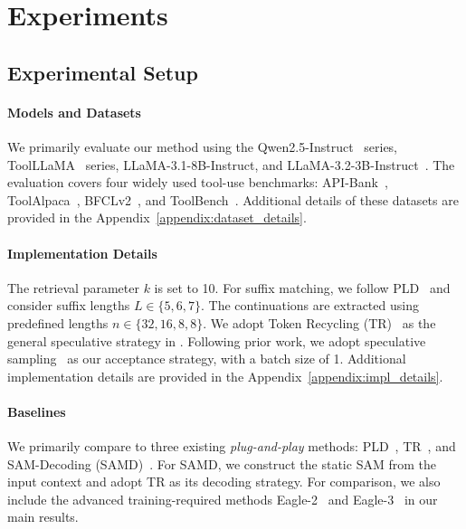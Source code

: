 \section{Experiments}

\subsection{Experimental Setup}
\label{sec:exp_setup}

\paragraph{Models and Datasets} 
We primarily evaluate our method using the Qwen2.5-Instruct~\citep{Qwen2.5} series, ToolLLaMA~\citep{Qin:2024toolllm} series, LLaMA-3.1-8B-Instruct, and LLaMA-3.2-3B-Instruct~\citep{llama3}. The evaluation covers four widely used tool-use benchmarks: API-Bank~\citep{apibank}, ToolAlpaca~\cite{ToolAlpaca}, BFCLv2~\cite{BFCL}, and ToolBench~\cite{Qin:2024toolllm}. Additional details of these datasets are provided in the Appendix~\ref{appendix:dataset_details}.

\paragraph{Implementation Details} 
The retrieval parameter $k$ is set to 10. For suffix matching, we follow PLD~\citep{saxena2023pld} and consider suffix lengths $L \in \{5,6,7\}$. The continuations are extracted using predefined lengths $n \in \{32, 16, 8, 8\}$. We adopt Token Recycling (TR)~\citep{luo:2025tokenrecycle} as the general speculative strategy in \method. Following prior work, we adopt speculative sampling~\citep{leviathan:2023spec} as our acceptance strategy, with a batch size of 1. Additional implementation details are provided in the Appendix~\ref{appendix:impl_details}.

\paragraph{Baselines} 
We primarily compare \method to three existing \textit{plug-and-play} methods: PLD~\citep{saxena2023pld}, TR~\citep{luo:2025tokenrecycle}, and SAM-Decoding (SAMD)~\citep{hu2025:samd}. For SAMD, we construct the static SAM from the input context and adopt TR as its decoding strategy. For comparison, we also include the advanced training-required methods Eagle-2~\citep{li2024:eagle2} and Eagle-3~\citep{li2025:eagle3} in our main results.

